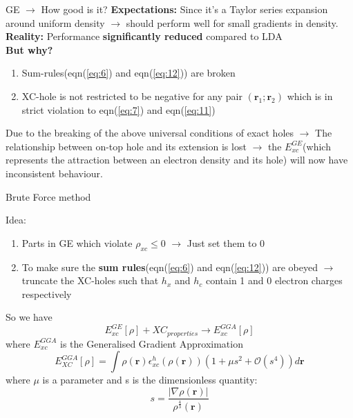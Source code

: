 \documentclass{beamer}
\begin{document}
	\begin{frame}[t]{GE $\rightarrow$ How good is it?}
	 \textbf{Expectations:} Since it's a Taylor series expansion around uniform density $\rightarrow$ should perform well for small gradients in density.\\
	 \vspace{0.2cm}
	 \textbf{Reality:} Performance \textbf{significantly reduced} compared to LDA\\
	 \vspace{0.2cm}
	 \textbf{But why?}
	 \begin{enumerate}
	 \item{Sum-rules(eqn(\ref{eq:6}) and eqn(\ref{eq:12})) are broken}
	 \item{XC-hole is not restricted to be negative for any pair $(\textbf{r}_1;\textbf{r}_2)$ which is in strict violation to eqn(\ref{eq:7}) and eqn(\ref{eq:11})}
	 \end{enumerate}
	 Due to the breaking of the above universal conditions of exact holes $\rightarrow$ The relationship between on-top hole and its extension is lost $\rightarrow$ the $E_{xc}^{GE}$(which represents the attraction between an electron density and its hole) will now have inconsistent behaviour.
	\end{frame}
	
	\begin{frame}[t]{Brute Force method}
	 \begin{block}{Idea:}
	  \begin{enumerate}
	   \item{Parts in GE which violate $\rho_{xc}\leqslant 0$ $\rightarrow$ Just set them to 0}
	   \item{To make sure the \textbf{sum rules}(eqn(\ref{eq:6}) and eqn(\ref{eq:12})) are obeyed $\rightarrow$ truncate the XC-holes such that $h_x$ and $h_c$ contain 1 and 0 electron charges respectively}
	  \end{enumerate}
	 \end{block}
	So we have
	\begin{equation}\label{eq:16}
	E_{xc}^{GE}[\rho] + XC_{properties} \rightarrow E_{xc}^{GGA}[\rho]
	\end{equation}
	where $E_{xc}^{GGA}$ is the Generalised Gradient Approximation
	\begin{equation}\label{eq:17}
	E_{XC}^{GGA}[\rho] = \displaystyle{\int}\rho(\textbf{r})\epsilon_{xc}^h(\rho(\textbf{r}))(1+\mu s^2 + \mathcal{O}(s^4))d\textbf{r}
	\end{equation}
	where $\mu$ is a parameter and s is the dimensionless quantity:
	\begin{equation}\label{eq:18}
	s = \frac{|\nabla\rho(\textbf{r})|}{\rho^{\frac{4}{3}}(\textbf{r})}
	\end{equation}
	\end{frame}
	
\end{document}
